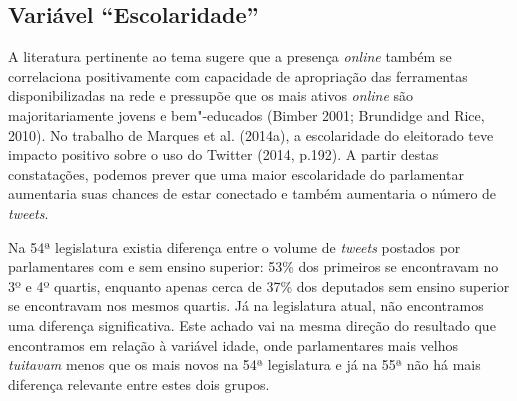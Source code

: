 \subsection{Variável ``Escolaridade''}

A literatura pertinente ao tema sugere que a presença \emph{online} também se
correlaciona positivamente com capacidade de apropriação das ferramentas
disponibilizadas na rede e pressupõe que os mais ativos \emph{online} são
majoritariamente jovens e bem"-educados (Bimber 2001; Brundidge and Rice,
2010). No trabalho de Marques et al. (2014a), a escolaridade do
eleitorado teve impacto positivo sobre o uso do Twitter (2014, p.192). A
partir destas constatações, podemos prever que uma maior escolaridade do
parlamentar aumentaria suas chances de estar conectado e também
aumentaria o número de \emph{tweets}.

Na 54ª legislatura existia diferença entre o volume de \emph{tweets}
postados por parlamentares com e sem ensino superior: 53\% dos primeiros
se encontravam no 3º e 4º quartis, enquanto apenas cerca de 37\% dos
deputados sem ensino superior se encontravam nos mesmos quartis. Já na
legislatura atual, não encontramos uma diferença significativa. Este
achado vai na mesma direção do resultado que encontramos em relação à
variável idade, onde parlamentares mais velhos \emph{tuitavam} menos que
os mais novos na 54ª legislatura e já na 55ª não há mais diferença
relevante entre estes dois grupos.

